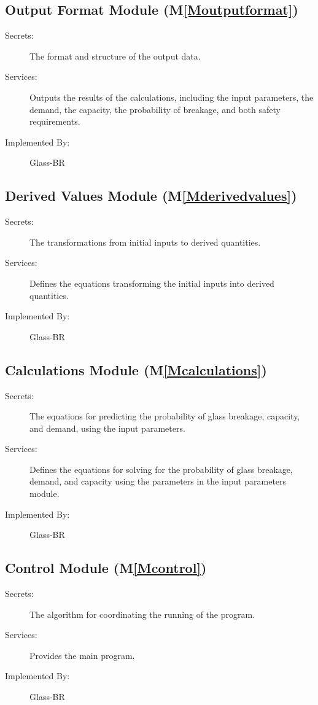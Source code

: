 \documentclass[12pt]{article}
\begin{document}
\subsection{Output Format Module (M\ref{Moutputformat})}
\label{Sec:OFM()}
\begin{description}
\item[Secrets:]The format and structure of the output data.
\item[Services:]Outputs the results of the calculations, including the input parameters, the demand, the capacity, the probability of breakage, and both safety requirements.
\item[Implemented By:]Glass-BR
\end{description}
\subsection{Derived Values Module (M\ref{Mderivedvalues})}
\label{Sec:DVM()}
\begin{description}
\item[Secrets:]The transformations from initial inputs to derived quantities.
\item[Services:]Defines the equations transforming the initial inputs into derived quantities.
\item[Implemented By:]Glass-BR
\end{description}
\subsection{Calculations Module (M\ref{Mcalculations})}
\label{Sec:CM()}
\begin{description}
\item[Secrets:]The equations for predicting the probability of glass breakage, capacity, and demand, using the input parameters.
\item[Services:]Defines the equations for solving for the probability of glass breakage, demand, and capacity using the parameters in the input parameters module.
\item[Implemented By:]Glass-BR
\end{description}
\subsection{Control Module (M\ref{Mcontrol})}
\label{Sec:CM()}
\begin{description}
\item[Secrets:]The algorithm for coordinating the running of the program.
\item[Services:]Provides the main program.
\item[Implemented By:]Glass-BR
\end{description}
\end{document}
